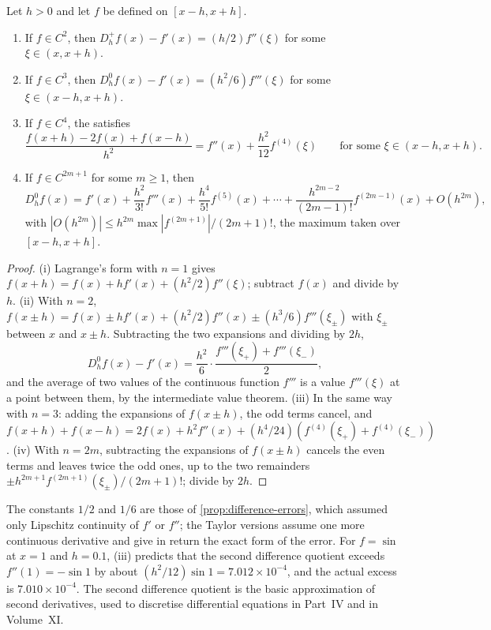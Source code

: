 \begin{proposition}
\label{prop:difference-taylor}
Let $h>0$ and let $f$ be defined on $[x-h,x+h]$.
\begin{enumerate}
\item If $f\in C^2$, then $D_h^+f(x)-f'(x)=(h/2)f''(\xi)$ for some $\xi\in(x,x+h)$.
\item If $f\in C^3$, then $D_h^0f(x)-f'(x)=(h^2/6)f'''(\xi)$ for some $\xi\in(x-h,x+h)$.
\item If $f\in C^4$, the  satisfies
\[
\frac{f(x+h)-2f(x)+f(x-h)}{h^2}=f''(x)+\frac{h^2}{12}f^{(4)}(\xi)\qquad\text{for some }\xi\in(x-h,x+h).
\]
\item If $f\in C^{2m+1}$ for some $m\ge1$, then
\[
D_h^0f(x)=f'(x)+\frac{h^2}{3!}f'''(x)+\frac{h^4}{5!}f^{(5)}(x)+\cdots+\frac{h^{2m-2}}{(2m-1)!}f^{(2m-1)}(x)+O(h^{2m}),
\]
with $|O(h^{2m})|\le h^{2m}\max|f^{(2m+1)}|/(2m+1)!$, the maximum taken over $[x-h,x+h]$.
\end{enumerate}
\end{proposition}

\begin{proof}
(i) Lagrange's form with $n=1$ gives $f(x+h)=f(x)+hf'(x)+(h^2/2)f''(\xi)$; subtract $f(x)$ and divide by $h$. (ii) With $n=2$, $f(x\pm h)=f(x)\pm hf'(x)+(h^2/2)f''(x)\pm(h^3/6)f'''(\xi_\pm)$ with $\xi_\pm$ between $x$ and $x\pm h$. Subtracting the two expansions and dividing by $2h$,
\[
D_h^0f(x)-f'(x)=\frac{h^2}6\cdot\frac{f'''(\xi_+)+f'''(\xi_-)}2 ,
\]
and the average of two values of the continuous function $f'''$ is a value $f'''(\xi)$ at a point between them, by the intermediate value theorem. (iii) In the same way with $n=3$: adding the expansions of $f(x\pm h)$, the odd terms cancel, and $f(x+h)+f(x-h)=2f(x)+h^2f''(x)+(h^4/24)(f^{(4)}(\xi_+)+f^{(4)}(\xi_-))$. (iv) With $n=2m$, subtracting the expansions of $f(x\pm h)$ cancels the even terms and leaves twice the odd ones, up to the two remainders $\pm h^{2m+1}f^{(2m+1)}(\xi_\pm)/(2m+1)!$; divide by $2h$.
\end{proof}

The constants $1/2$ and $1/6$ are those of \cref{prop:difference-errors}, which assumed only Lipschitz continuity of $f'$ or $f''$; the Taylor versions assume one more continuous derivative and give in return the exact form of the error. For $f=\sin$ at $x=1$ and $h=0.1$, (iii) predicts that the second difference quotient exceeds $f''(1)=-\sin1$ by about $(h^2/12)\sin1=7.012\times10^{-4}$, and the actual excess is $7.010\times10^{-4}$. The second difference quotient is the basic approximation of second derivatives, used to discretise differential equations in Part~IV and in Volume~XI.

